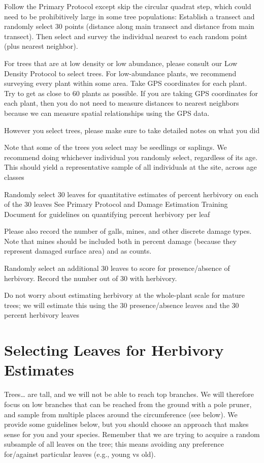 \documentclass[
  letterpaper,
  oneside,
  open=any]{scrbook}
\begin{document}
Follow the Primary Protocol except skip the circular quadrat step, which
could need to be prohibitively large in some tree populations: Establish
a transect and randomly select 30 points (distance along main transect
and distance from main transect). Then select and survey the individual
nearest to each random point (plus nearest neighbor).

For trees that are at low density or low abundance, please consult our
Low Density Protocol to select trees. For low-abundance plants, we
recommend surveying every plant within some area. Take GPS coordinates
for each plant. Try to get as close to 60 plants as possible. If you are
taking GPS coordinates for each plant, then you do not need to measure
distances to nearest neighbors because we can measure spatial
relationships using the GPS data.

However you select trees, please make sure to take detailed notes on
what you did

Note that some of the trees you select may be seedlings or saplings. We
recommend doing whichever individual you randomly select, regardless of
its age. This should yield a representative sample of all individuals at
the site, across age classes

Randomly select 30 leaves for quantitative estimates of percent
herbivory on each of the 30 leaves See Primary Protocol and Damage
Estimation Training Document for guidelines on quantifying percent
herbivory per leaf

Please also record the number of galls, mines, and other discrete damage
types. Note that mines should be included both in percent damage
(because they represent damaged surface area) and as counts.

Randomly select an additional 30 leaves to score for presence/absence of
herbivory. Record the number out of 30 with herbivory.

Do not worry about estimating herbivory at the whole-plant scale for
mature trees; we will estimate this using the 30 presence/absence leaves
and the 30 percent herbivory leaves

\section{Selecting Leaves for Herbivory
Estimates}\label{selecting-leaves-for-herbivory-estimates}

Trees\ldots{} are tall, and we will not be able to reach top branches.
We will therefore focus on low branches that can be reached from the
ground with a pole pruner, and sample from multiple places around the
circumference (see below). We provide some guidelines below, but you
should choose an approach that makes sense for you and your species.
Remember that we are trying to acquire a random subsample of all leaves
on the tree; this means avoiding any preference for/against particular
leaves (e.g., young vs old).
\end{document}
